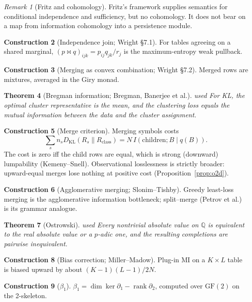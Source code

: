 \documentclass[11pt]{article}
\newtheorem{theorem}{Theorem}[section]
\theoremstyle{definition}
\newtheorem{construction}[theorem]{Construction}
\theoremstyle{remark}
\newtheorem{remark}[theorem]{Remark}
\newcommand{\Q}{\mathbb{Q}}
\newcommand{\KL}{D_{\mathrm{KL}}}
\newcommand{\st}[1]{\textsf{\small\color{gray}#1}}
\begin{document}
\begin{remark}[Fritz and cohomology]
Fritz's framework supplies semantics for conditional independence and sufficiency, but no cohomology. It does not bear on a map from information cohomology into a persistence module.
\end{remark}
\begin{construction}[Independence join; Wright \S7.1] For tables agreeing on a shared marginal, $(p\bowtie q)_{ijk}=p_{ij}q_{jk}/r_j$ is the maximum-entropy weak pullback.\end{construction}
\begin{construction}[Merging as convex combination; Wright \S7.2] Merged rows are mixtures, averaged in the Giry monad.\end{construction}
\begin{theorem}[Bregman information; Bregman, Banerjee et al.]\label{thm:breg}\st{used}
For KL, the optimal cluster representative is the mean, and the clustering loss equals the mutual information between the data and the cluster assignment.
\end{theorem}
\begin{construction}[Merge criterion]
Merging symbols costs
\[\textstyle\sum_s n_s\KL(R_s\|R_{\text{class}})=N\,I(\text{children};B\mid q(B)).\] The cost is zero iff the child rows are equal, which is strong (downward) lumpability (Kemeny--Snell). Observational losslessness is strictly broader: upward-equal merges lose nothing at positive cost (Proposition~\ref{prop:o2d}).
\end{construction}
\begin{construction}[Agglomerative merging; Slonim--Tishby] Greedy least-loss merging is the agglomerative information bottleneck; split--merge (Petrov et al.) is its grammar analogue.\end{construction}
\begin{theorem}[Ostrowski]\label{thm:ostrowski}\st{used}
Every nontrivial absolute value on $\Q$ is equivalent to the real absolute value or a $p$-adic one, and the resulting completions are pairwise inequivalent.
\end{theorem}
\begin{construction}[Bias correction; Miller--Madow] Plug-in MI on a $K\times L$ table is biased upward by about $(K-1)(L-1)/2N$.\end{construction}
\begin{construction}[$\beta_1$] $\beta_1=\dim\ker\partial_1-\operatorname{rank}\partial_2$, computed over $\mathrm{GF}(2)$ on the 2-skeleton.\end{construction}
\end{document}
